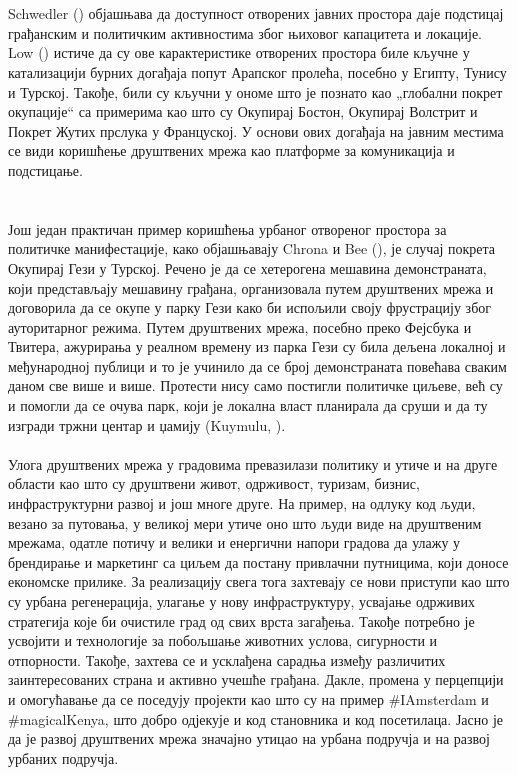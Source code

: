 \documentclass{article}
\begin{document}
\\\\
Schwedler (\cite{s_2013}) објашњава да доступност отворених јавних простора даје подстицај грађанским и политичким активностима због њиховог капацитета и локације. Low (\cite{l_2017}) истиче да су ове карактеристике отворених простора биле кључне у катализацији бурних догађаја попут Арапског пролећа, посебно у Египту, Тунису и Турској. Такође, били су кључни у ономе што је познато као „глобални покрет окупације“ са примерима као што су Окупирај Бостон, Окупирај Волстрит и Покрет Жутих прслука у Француској. У основи ових догађаја на јавним местима се види коришћење друштвених мрежа као платформе за комуникација и подстицање. \\\\\\
Још један практичан пример коришћења урбаног отвореног простора за политичке манифестације, како објашњавају Chrona и Bee (\cite{cb_2017}), је случај покрета Окупирај Гези у Турској. Речено је да се хетерогена мешавина демонстраната, који представљају мешавину грађана, организовала путем друштвених мрежа и договорила да се окупе у парку Гези како би испољили своју фрустрацију због ауторитарног режима. Путем друштвених мрежа, посебно преко Фејсбука и Твитера, ажурирања у реалном времену из парка Гези су била дељена локалној и међународној публици и то је учинило да се број демонстраната повећава сваким даном све више и више. Протести нису само постигли политичке циљеве, већ су и помогли да се очува парк, који је локална власт планирала да сруши и да ту изгради тржни центар и џамију (Kuymulu, \cite{k_2013}).
\\\\
Улога друштвених мрежа у градовима превазилази политику и утиче и на друге области као што су друштвени живот, одрживост, туризам, бизнис, инфраструктурни развој и још многе друге. На пример, на одлуку код људи, везано за путовања, у великој мери утиче оно што људи виде на друштвеним мрежама, одатле потичу и велики и енергични напори градова да улажу у брендирање и маркетинг са циљем да постану привлачни путницима, који доносе економске прилике. За реализацију свега тога захтевају се нови приступи као што су урбана регенерација, улагање у нову инфраструктуру, усвајање одрживих стратегија које би очистиле град од свих врста загађења. Такође потребно је усвојити и технологије за побољшање животних услова, сигурности и отпорности. Такође, захтева се и усклађена сарадња између различитих заинтересованих страна и активно учешће грађана. Дакле, промена у перцепцији и омогућавање да се поседују пројекти као што су на пример #IAmsterdam и #magicalKenya, што добро одјекује и код становника и код посетилаца. Јасно је да је развој друштвених мрежа значајно утицао на урбана подручја и на развој урбаних подручја.
\\
\newpage
\end{document}
